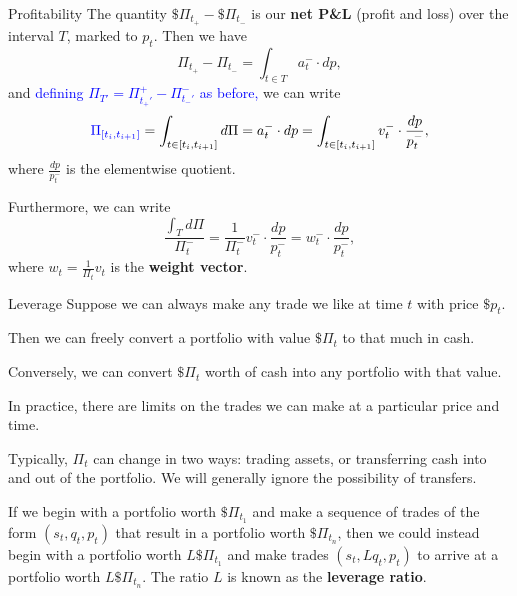 \documentclass{beamer}
\begin{document}
\begin{frame}{Profitability}
	The quantity $\$\Pi_{t_+} - \$\Pi_{t_-}$ is our \textbf{net P\&L} (profit and loss) over the interval $T$, marked to $p_t$.
	Then we have
	$$\Pi_{t_+} - \Pi_{t_-} = \int_{t\in T} a_t^- \cdot dp,$$
	and \textcolor{blue}{defining $\Pi_{T'} = \Pi_{t_+'}^+ - \Pi_{t_-'}^-$ as before,} we can write
	$$\textcolor{blue}{\Pi_{[t_i,t_{i+1}]}} = \int_{t\in [t_i, t_{i+1}]} d\Pi = a_t^- \cdot dp = \int_{t\in [t_i, t_{i+1}]} v_t^- \cdot \frac{dp}{p_t^-},$$
	where $\frac{dp}{p_t^-}$ is the elementwise quotient.

	Furthermore, we can write
	$$\frac{\int_T d\Pi}{\Pi_t^-} = \frac{1}{\Pi_t^-}v_t^- \cdot \frac{dp}{p_t^-} = w_t^- \cdot \frac{dp}{p_t^-},$$
	where $w_t = \frac{1}{\Pi_t}v_t$ is the \textbf{weight vector}. %
\end{frame}

\begin{frame}{Leverage}
	Suppose we can always make any trade we like at time $t$ with price $\$p_t$.

	Then we can freely convert a portfolio with value $\$\Pi_t$ to that much in cash.

	Conversely, we can convert $\$\Pi_t$ worth of cash into any portfolio with that value.

	In practice, there are limits on the trades we can make at a particular price and time.

	\pause

	Typically, $\Pi_t$ can change in two ways: trading assets, or transferring cash into and out of the portfolio. We will generally ignore the possibility of transfers.

	\pause

	If we begin with a portfolio worth $\$\Pi_{t_1}$ and make a sequence of trades of the form $(s_t,q_t,p_t)$ that result in a portfolio worth $\$\Pi_{t_n}$, then we could instead begin with a portfolio worth $L \$\Pi_{t_1}$ and make trades $(s_t, L q_t, p_t)$ to arrive at a portfolio worth $L \$\Pi_{t_n}$. The ratio $L$ is known as the \textbf{leverage ratio}.
\end{frame}
\end{document}
